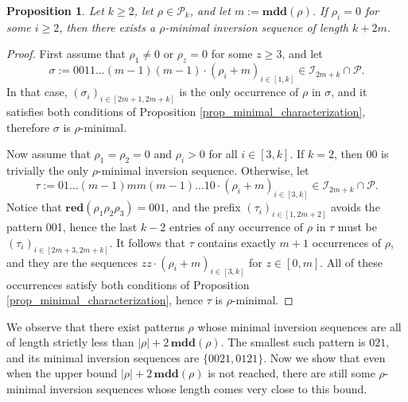 \documentclass[a4paper,11pt]{article}
\newtheorem{prop}[thm]{Proposition}
\theoremstyle{definition}
\theoremstyle{remark}
\newcommand{\I}{\mathcal{I}}
\renewcommand{\P}{\mathcal{P}}
\newcommand{\mdd}{\mathbf{mdd}}
\newcommand{\red}{\mathbf{red}}
\begin{document}
\begin{prop} \label{prop_tight_ub}
    Let $k \geq 2$, let $\rho \in \P_k$, and let $m := \mdd(\rho)$. If $\rho_i = 0$ for some $i \geq 2$, then there exists a $\rho$-minimal inversion sequence of length $k + 2m$.
\end{prop}
\begin{proof}
    First assume that $\rho_1 \neq 0$ or $\rho_z = 0$ for some $z \geq 3$, and let $$\sigma := 0011 \dots (m-1)(m-1) \cdot (\rho_i + m)_{i \in [1,k]} \in \I_{2m + k} \cap \P.$$
    In that case, $(\sigma_i)_{i \in [2m+1, 2m+k]}$ is the only occurrence of $\rho$ in $\sigma$, and it satisfies both conditions of Proposition \ref{prop_minimal_characterization}, therefore $\sigma$ is $\rho$-minimal.

     Now assume that $\rho_1 = \rho_2 = 0$ and $\rho_i > 0$ for all $i \in [3,k]$. If $k = 2$, then $00$ is trivially the only $\rho$-minimal inversion sequence. Otherwise, let $$\tau := 01 \dots (m-1)mm(m-1) \dots 10 \cdot (\rho_i + m)_{i \in [3,k]} \in \I_{2m + k} \cap \P.$$
     Notice that $\red(\rho_1 \rho_2 \rho_3) = 001$, and the prefix $(\tau_i)_{i \in [1, 2m+2]}$ avoids the pattern 001, hence the last $k-2$ entries of any occurrence of $\rho$ in $\tau$ must be $(\tau_i)_{i \in [2m+3, 2m+k]}$. 
     It follows that $\tau$ contains exactly $m+1$ occurrences of $\rho$, and they are the sequences $zz \cdot (\rho_i + m)_{i \in [3,k]}$ for $z \in [0,m]$. All of these occurrences satisfy both conditions of Proposition \ref{prop_minimal_characterization}, hence $\tau$ is $\rho$-minimal.
\end{proof}

We observe that there exist patterns $\rho$ whose minimal inversion sequences are all of length strictly less than $|\rho| + 2\, \mdd(\rho)$. The smallest such pattern is $021$, and its minimal inversion sequences are $\{0021, 0121\}$.
Now we show that even when the upper bound $|\rho| + 2\,\mdd(\rho)$ is not reached, there are still some $\rho$-minimal inversion sequences whose length comes very close to this bound.
\end{document}
